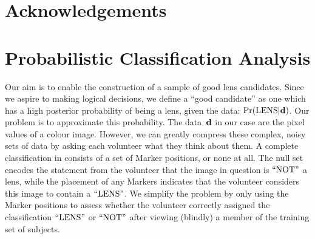 \documentclass[useAMS,usenatbib,a4paper]{mn2e}
\begin{document}


\section*{Acknowledgements}
 



\appendix


\section{Probabilistic Classification Analysis}
\label{appendix:swap}

Our aim is to enable the construction of a sample of good lens candidates.
Since we aspire to making logical  decisions, we define a  ``good candidate''
as one which has a high posterior probability of being a lens, given the data:
${\rm Pr}({\rm LENS}|{\mathbf{d}})$. Our problem is to approximate this probability. The data~${\mathbf{d}}$
in our case are the pixel values of a colour image. However, we can greatly
compress these complex, noisy sets of data by asking each volunteer what they
think about them. A complete  classification in \sw consists of a set of
Marker positions, or none at all. The null set encodes the statement from
the volunteer that the image in question is ${\rm ``NOT"}$ a lens, while the
placement of any  Markers indicates that the volunteer considers this image to
contain a ${\rm ``LENS"}$.  We simplify the problem by only using the Marker
positions to assess whether the volunteer  correctly assigned the
classification ${\rm ``LENS"}$ or ${\rm ``NOT"}$ after viewing (blindly) a member of
the training set of subjects. 
\end{document}
